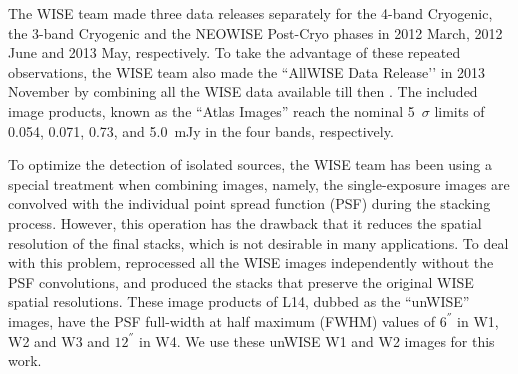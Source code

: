 \documentclass[numberedappendix,apj,twocolumn]{emulateapj}
\begin{document}
    The WISE team made three data releases separately for the 4-band Cryogenic, the 3-band Cryogenic and the NEOWISE Post-Cryo phases in 2012 March, 2012 June and 2013 May, respectively. To take the advantage of these repeated observations, the WISE team also made the ``AllWISE Data Release’’ in 2013 November by combining all the WISE data available till then \citep[see][for details]{2013wise.rept....1C}. The included image products,
known as the ``Atlas Images'' reach the nominal 5~$\sigma$ limits of 0.054, 0.071, 0.73, and 5.0~mJy in the four bands, respectively. 

To optimize the detection of isolated sources, the WISE team has been using a special treatment when combining images, namely, the single-exposure images are convolved with the individual point spread function (PSF) during the stacking process. However, this operation has the drawback that it reduces the spatial resolution of the final stacks, which is not desirable in many applications. To deal with this problem, \citet[][hereafter L14]{Lang2014e} reprocessed all the WISE images independently without the PSF convolutions, and produced the stacks that preserve the original WISE spatial resolutions. These image products of L14,  dubbed as the ``unWISE'' images, have the PSF full-width at half maximum (FWHM) values of $6^{''}$ in W1, W2 and W3 and $12^{''}$ in W4. We use these unWISE W1 and W2 images for this work.
\end{document}
